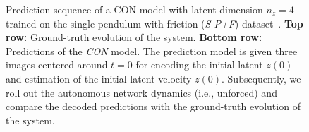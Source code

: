 \begin{figure}[hb]
    \caption{Prediction sequence of a \gls{CON} model with latent dimension $n_z=4$ trained on the single pendulum with friction (\emph{S-P+F}) dataset~\citep{botev2021priors}. 
    \textbf{Top row:} Ground-truth evolution of the system. \textbf{Bottom row:} Predictions of the \emph{CON} model. \newline
    The prediction model is given three images centered around $t=0$ for encoding the initial latent $z(0)$ and estimation of the initial latent velocity $\dot{z}(0)$. Subsequently, we roll out the autonomous network dynamics (i.e., unforced) and compare the decoded predictions with the ground-truth evolution of the system.  
    }\label{fig:apx-con:latent_dynamics:sequence_of_stills:s-p+f:rollout6}
\end{figure}


